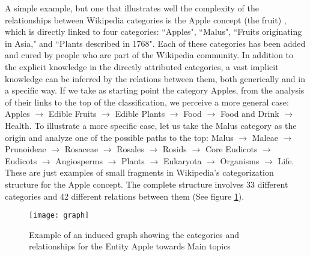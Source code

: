 A simple example, but one that illustrates well the complexity of the relationships between Wikipedia categories is the Apple concept (the fruit) , which is directly linked to four categories: ``Apples", ``Malus", ``Fruits originating in Asia," and ``Plants described in 1768". Each of these categories has been added and cured by people who are part of the Wikipedia community. In addition to the explicit knowledge in the directly attributed categories, a vast implicit knowledge can be inferred by the relations between them, both generically and in a specific way. If we take as starting point the category Apples, from the analysis of their links to the top of the classification, we perceive a more general case: Apples $\rightarrow$  Edible Fruits $\rightarrow$ Edible Plants $\rightarrow$ Food $\rightarrow$ Food and Drink $\rightarrow$ Health.
To illustrate a more specific case, let us take the Malus category as the origin and analyze one of the possible paths to the top: Malus $\rightarrow$ Maleae $\rightarrow$ Prunoideae $\rightarrow$ Rosaceae $\rightarrow$ Rosales $\rightarrow$ Rosids $\rightarrow$ Core Eudicots $\rightarrow$ Eudicots $\rightarrow$ Angiosperms $\rightarrow$ Plants $\rightarrow$ Eukaryota $\rightarrow$ Organisms $\rightarrow$ Life.
These are just examples of small fragments in Wikipedia's categorization structure for the Apple concept. The complete structure involves 33 different categories and 42 different relations between them (See figure \ref{fig:semantics-category-apple}).


\begin{figure}[H]
\centering
  \texttt{[image: graph]}
  \caption{Example of an induced graph showing the categories and relationships for the Entity Apple towards Main topics}
  \label{fig:semantics-category-apple}
\end{figure}




